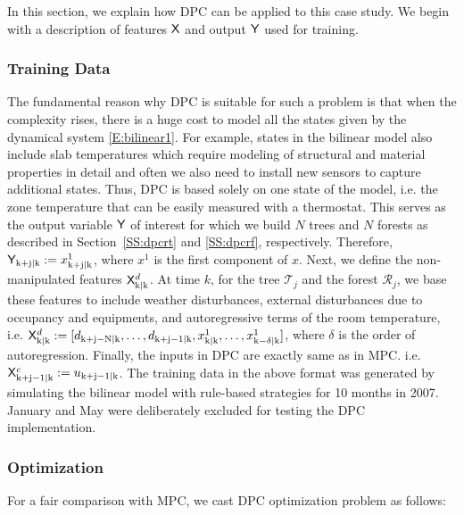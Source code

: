 In this section, we explain how DPC can be applied to this case study. We begin with a description of features $\mathsf{X}$ and output $\mathsf{Y}$ used for training.

\subsubsection{Training Data} 
\label{SSS:dpc_data}

The fundamental reason why DPC  is suitable for such a problem is that when the complexity rises, there is a huge cost to model all the states given by the dynamical system \eqref{E:bilinear1}. For example, states in the bilinear model also include slab temperatures which require modeling of structural and material properties in detail and often we also need to install new sensors to capture additional states. Thus, DPC is based solely on one state of the model, i.e. the zone temperature that can be easily measured with a thermostat. This serves as the output variable $\mathsf{Y}$ of interest for which we build $N$ trees and $N$ forests as described in Section~\ref{SS:dpcrt} and \ref{SS:dpcrf}, respectively. Therefore, $\mathsf{Y}_{\mathrm{k+j|k}}:=x_{\mathrm{k+j|k}}^1$, where $x^1$ is the first component of $x$.
Next, we define the non-manipulated features $\mathsf{X}^d_{\mathrm{k|k}}$. At time $k$, for the tree $\mathcal{T}_j$ and the forest $\mathcal{R}_j$, we base these features to include weather disturbances, external disturbances due to occupancy and equipments, and autoregressive terms of the room temperature, i.e.
$\mathsf{X}^d_{\mathrm{k|k}}:=[ d_{\mathrm{k+j-N|k}} ,\dots,d_{\mathrm{k+j-1|k}}, x_{\mathrm{k|k}}^1,\dots, x_{\mathrm{k-\delta|k}}^1 ]$, where $\delta$ is the order of autoregression.
Finally, the inputs in DPC are exactly same as in MPC. i.e. $\mathsf{X}^c_{\mathrm{k+j-1|k}}:=u_{\mathrm{k+j-1|k}}$.
The training data in the above format was generated by simulating the bilinear model with rule-based strategies for 10 months in 2007. January and May were deliberately excluded for testing the DPC implementation.
\subsubsection{Optimization} 
\label{SSS:dpc_opt}
For a fair comparison with MPC, we cast DPC optimization problem as follows:

